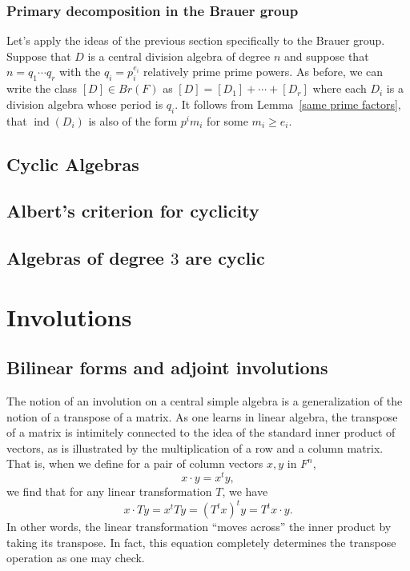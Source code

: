 \documentclass[12pt]{report}
\theoremstyle{plain}
\newcommand{\oper}[1]{\operatorname{#1}}
\newcommand{\ind}{\oper{ind}}
\begin{document}
\subsection{Primary decomposition in the Brauer group}

Let's apply the ideas of the previous section specifically to the Brauer
group. Suppose that $D$ is a central division algebra of degree $n$ and
suppose that $n = q_1 \cdots q_r$ with the $q_i = p_i^{e_i}$ relatively
prime prime powers. As before, we can write the class $[D] \in Br(F)$ as
$[D] = [D_1] + \cdots + [D_r]$ where each $D_i$ is a division algebra whose
period is $q_i$. 
It follows from Lemma~\ref{same prime factors}, that $\ind(D_i)$ is also of
the form $p^i{m_i}$ for some $m_i \geq e_i$. 

\section{Cyclic Algebras}

\section{Albert's criterion for cyclicity}

\section{Algebras of degree $3$ are cyclic}

\chapter{Involutions}

\section{Bilinear forms and adjoint involutions}

The notion of an involution on a central simple algebra is a generalization
of the notion of a transpose of a matrix. As one learns in linear algebra,
the transpose of a matrix is intimitely connected to the idea of the
standard inner product of vectors, as is illustrated by the multiplication
of a row and a column matrix. That is, when we define for a pair of column
vectors $x, y$ in $F^n$,
\[ x \cdot y = x^t y, \]
we find that for any linear transformation $T$, we have
\[ x \cdot Ty = x^t T y = (T^t x)^t y = T^t x \cdot y.\]
In other words, the linear transformation ``moves across'' the inner
product by taking its transpose. In fact, this equation completely
determines the transpose operation as one may check.
\end{document}
